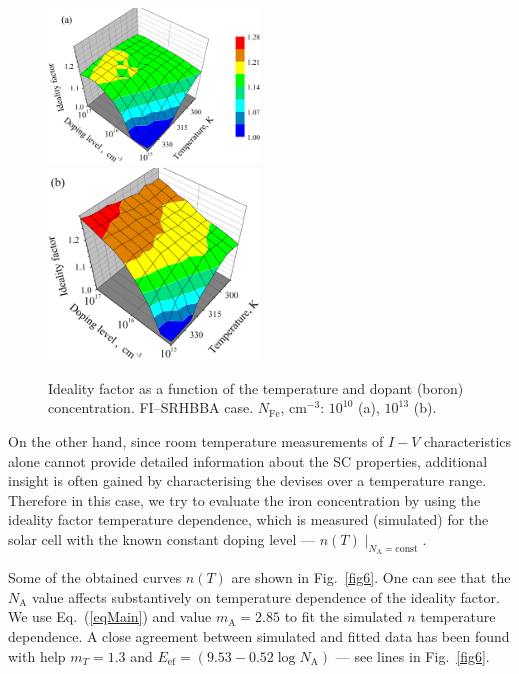 \documentclass [sort&compress] {elsarticle}
\begin{document}
\begin{figure}
\includegraphics[width=0.5\textwidth]{Fig5a}%
\includegraphics[width=0.5\textwidth]{Fig5b}
\caption{\label{fig5}
Ideality factor as a function of the temperature and dopant (boron) concentration.
FI--SRHBBA case.
$N_\mathrm{Fe}$, cm$^{-3}$: $10^{10}$ (a), $10^{13}$ (b).
}%
\end{figure}

On the other hand, since room temperature measurements of $I-V$ characteristics alone cannot provide detailed information about the SC properties,
additional insight is often gained by characterising the devises over a temperature range.
Therefore in this case, we try to evaluate the iron concentration by using the ideality factor temperature dependence,
which is measured (simulated)  for the solar cell with  the known constant doping level --- $n(T)\mid_{N_\mathrm{A}=\mathrm{const}}$.

Some of the obtained curves $n(T)$ are shown in Fig.~\ref{fig6}.
One can see that the $N_\mathrm{A}$ value affects substantively on temperature dependence of the ideality factor.
We use Eq.~(\ref{eqMain})  and value $m_\mathrm{A}=2.85$ to fit the simulated $n$ temperature dependence.
A close agreement between simulated and fitted data has been found with help $m_T=1.3$ and $E_\mathrm{ef}=(9.53-0.52\log N_\mathrm{A})$ --- see lines in Fig.~\ref{fig6}.
\end{document}
